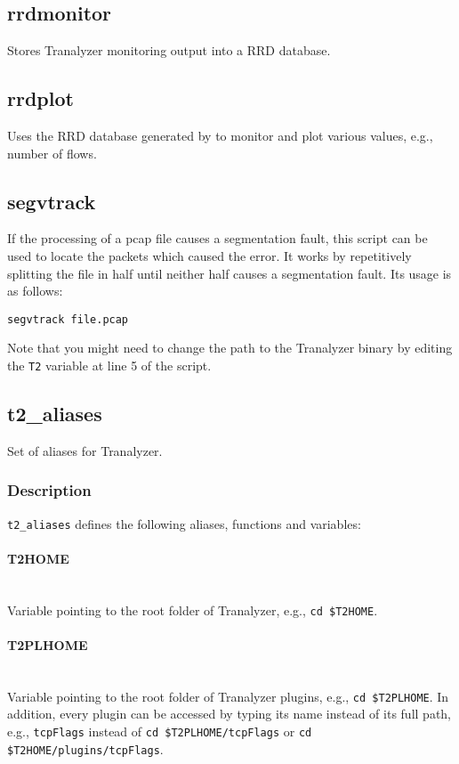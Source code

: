 \documentclass[documentation]{subfiles}
\begin{document}
\subsection{rrdmonitor}\label{rrdmonitor}
Stores Tranalyzer monitoring output into a RRD database.

\subsection{rrdplot}\label{rrdplot}
Uses the RRD database generated by {\tt{}} to monitor and plot various values, e.g., number of flows.

\subsection{segvtrack}
If the processing of a pcap file causes a segmentation fault, this script can be used to locate the packets which caused the error. It works by repetitively splitting the file in half until neither half causes a segmentation fault.
Its usage is as follows:
\begin{verbatim}
segvtrack file.pcap
\end{verbatim}
Note that you might need to change the path to the Tranalyzer binary by editing the {\tt T2} variable at line 5 of the script.

\subsection{t2\_aliases}\label{t2aliases}
Set of aliases for Tranalyzer.

\subsubsection{Description}
{\tt t2\_aliases} defines the following aliases, functions and variables:

\paragraph{T2HOME}~\\
Variable pointing to the root folder of Tranalyzer, e.g., {\tt cd \$T2HOME}.
\paragraph{T2PLHOME}~\\
Variable pointing to the root folder of Tranalyzer plugins, e.g., {\tt cd \$T2PLHOME}.
In addition, every plugin can be accessed by typing its name instead of its full path, e.g., {\tt tcpFlags} instead of {\tt cd \$T2PLHOME/tcpFlags} or {\tt cd \$T2HOME/plugins/tcpFlags}.
\end{document}
